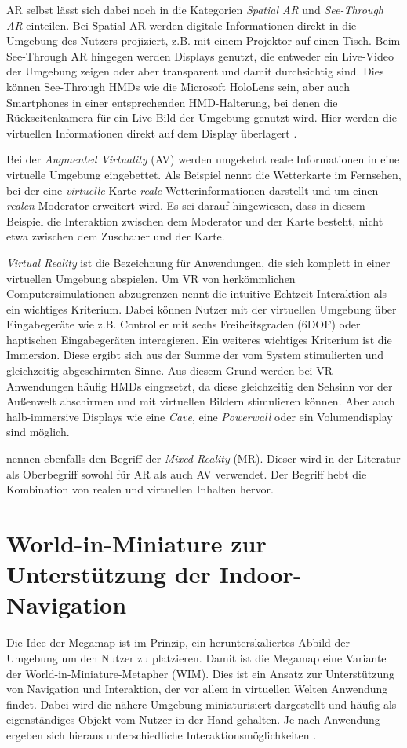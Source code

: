 AR selbst lässt sich dabei noch in die Kategorien \emph{Spatial AR} und \emph{See-Through AR} einteilen.
Bei Spatial AR werden digitale Informationen direkt in die Umgebung des Nutzers projiziert, z.B. mit einem Projektor auf einen Tisch.
Beim See-Through AR hingegen werden Displays genutzt, die entweder ein Live-Video der Umgebung zeigen oder aber transparent und damit durchsichtig sind.
Dies können See-Through HMDs wie die Microsoft HoloLens sein, aber auch Smartphones in einer entsprechenden HMD-Halterung, bei denen die Rückseitenkamera für ein Live-Bild der Umgebung genutzt wird.
Hier werden die virtuellen Informationen direkt auf dem Display überlagert \autocite{Zachmann2015}.

Bei der \emph{Augmented Virtuality} (AV) werden umgekehrt reale Informationen in eine virtuelle Umgebung eingebettet.
Als Beispiel nennt \textcite[6]{Schroeder2017} die Wetterkarte im Fernsehen, bei der eine \emph{virtuelle} Karte \emph{reale} Wetterinformationen darstellt und um einen \emph{realen} Moderator erweitert wird.
Es sei darauf hingewiesen, dass in diesem Beispiel die Interaktion zwischen dem Moderator und der Karte besteht, nicht etwa zwischen dem Zuschauer und der Karte.

\emph{Virtual Reality} ist die Bezeichnung für Anwendungen, die sich komplett in einer virtuellen Umgebung abspielen.
Um VR von herkömmlichen Computersimulationen abzugrenzen nennt \textcite{Zachmann2015} die intuitive Echtzeit-Interaktion als ein wichtiges Kriterium.
Dabei können Nutzer mit der virtuellen Umgebung über Eingabegeräte wie z.B. Controller mit sechs Freiheitsgraden (6DOF) oder haptischen Eingabegeräten interagieren.
Ein weiteres wichtiges Kriterium ist die Immersion.
Diese ergibt sich aus der Summe der vom System stimulierten und gleichzeitig abgeschirmten Sinne.
Aus diesem Grund werden bei VR-Anwendungen häufig HMDs eingesetzt, da diese gleichzeitig den Sehsinn vor der Außenwelt abschirmen und mit virtuellen Bildern stimulieren können.
Aber auch halb-immersive Displays wie eine \emph{Cave}, eine \emph{Powerwall} oder ein Volumendisplay sind möglich.

\textcite{Milgram1994} nennen ebenfalls den Begriff der \emph{Mixed Reality} (MR).
Dieser wird in der Literatur als Oberbegriff sowohl für AR als auch AV verwendet.
Der Begriff hebt die Kombination von realen und virtuellen Inhalten hervor.

\section{World-in-Miniature zur Unterstützung der Indoor-Navigation}
Die Idee der Megamap ist im Prinzip, ein herunterskaliertes Abbild der Umgebung um den Nutzer zu platzieren.
Damit ist die Megamap eine Variante der World-in-Miniature-Metapher (WIM).
Dies ist ein Ansatz zur Unterstützung von Navigation und Interaktion, der vor allem in virtuellen Welten Anwendung findet.
Dabei wird die nähere Umgebung miniaturisiert dargestellt und häufig als eigenständiges Objekt vom Nutzer in der Hand gehalten.
Je nach Anwendung ergeben sich hieraus unterschiedliche Interaktionsmöglichkeiten \parencite{Stoakley1995}.

